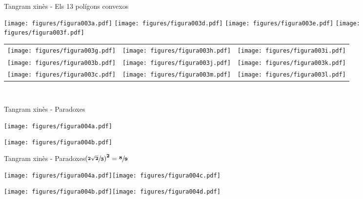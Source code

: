 \documentclass[14pt]{beamer}
\begin{document}
    \begin{frame}{Tangram xinès - Els 13 polígons convexos}
        \begin{center}
            \texttt{[image: figures/figura003a.pdf]}\qquad
            \texttt{[image: figures/figura003d.pdf]}\qquad
            \texttt{[image: figures/figura003e.pdf]}\qquad
            \texttt{[image: figures/figura003f.pdf]}\\ \bigskip
            \begin{tabular}{ccc}
                \texttt{[image: figures/figura003g.pdf]} &
                \texttt{[image: figures/figura003h.pdf]} &
                \texttt{[image: figures/figura003i.pdf]} \\[1ex]
                \texttt{[image: figures/figura003b.pdf]} &
                \texttt{[image: figures/figura003j.pdf]} &
                \texttt{[image: figures/figura003k.pdf]} \\[1ex]
                \texttt{[image: figures/figura003c.pdf]} &
                \texttt{[image: figures/figura003m.pdf]} &
                \texttt{[image: figures/figura003l.pdf]} \\[1ex]
            \end{tabular}\\
        \end{center}
    \end{frame}

    \begin{frame}{Tangram xinès - Paradoxes}
        \begin{center}
            \texttt{[image: figures/figura004a.pdf]}\;\;\qquad\; \\

            \vspace{3em}

            \texttt{[image: figures/figura004b.pdf]}\qquad{} \\
        \end{center}
    \end{frame}

    \begin{frame}{Tangram xinès - Paradoxes\quad $\mathbf{\left(\sfrac{2\sqrt{2}}{3}\right)^2 = \sfrac{8}{9}}$}
        \begin{center}
            \texttt{[image: figures/figura004a.pdf]}\;\;\qquad\;\texttt{[image: figures/figura004c.pdf]} \\

            \vspace{3em}

            \texttt{[image: figures/figura004b.pdf]}\qquad\texttt{[image: figures/figura004d.pdf]} \\
        \end{center}
    \end{frame}
\end{document}
